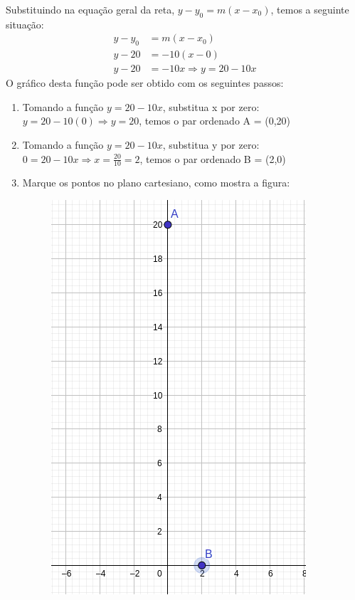 \begin{multicols*}{2}
    Substituindo na equação geral da reta, $y - y_0 = m(x-x_0)$, temos a seguinte situação:
    \begin{align*}
    y - y_0 &= m(x-x_0) \\
    y - 20 &= -10(x-0)\\
    y - 20 &= -10x  \Rightarrow y = 20 -10x
    \end{align*}
    O gráfico desta função pode ser obtido com os seguintes passos:
    \begin{enumerate}[wide, labelwidth=!, labelindent=0pt]
        \item Tomando a função $ y = 20 -10x$, substitua x por zero: $y = 20 - 10(0) \Rightarrow
                  y = 20$, temos o par ordenado A = (0,20)
        \item Tomando a função $ y = 20 -10x$, substitua y por zero: $0 = 20 - 10x \Rightarrow
                  x = \frac{20}{10} = 2$, temos o par ordenado B = (2,0)
        \item Marque os pontos no plano cartesiano, como mostra a figura:
              \begin{figure}[H]
                  \centering
                  \includegraphics[scale=0.3]{assets/rafael/img12.png}
              \end{figure}

\end{enumerate}
\end{multicols*}
